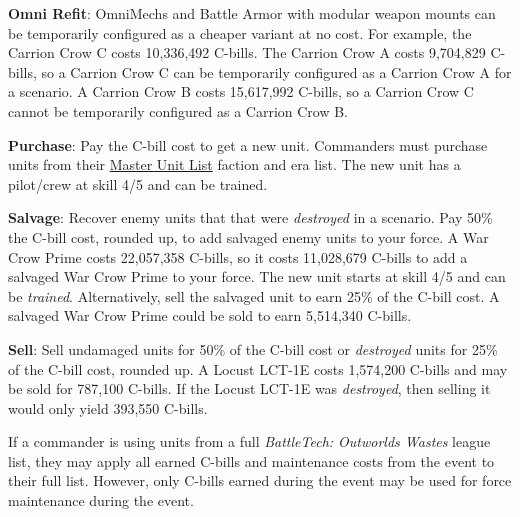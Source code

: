 \begin{description}
\item {\bfseries Omni Refit}: OmniMechs and Battle Armor with modular weapon mounts can be temporarily configured as a cheaper variant at no cost.
For example, the Carrion Crow C costs 10,336,492 C-bills.
The Carrion Crow A costs 9,704,829 C-bills, so a Carrion Crow C can be temporarily configured as a Carrion Crow A for a scenario.
A Carrion Crow B costs 15,617,992 C-bills, so a Carrion Crow C cannot be temporarily configured as a Carrion Crow B.

\item {\bfseries Purchase}: Pay the C-bill cost to get a new unit.
Commanders must purchase units from their \href{http://www.masterunitlist.info}{Master Unit List} faction and era list.
The new unit has a pilot/crew at skill 4/5 and can be trained.

\item {\bfseries Salvage}: Recover enemy units that that were \emph{destroyed} in a scenario.
Pay 50\% the C-bill cost, rounded up, to add salvaged enemy units to your force.
A War Crow Prime costs 22,057,358 C-bills, so it costs 11,028,679 C-bills to add a salvaged War Crow Prime to your force.
The new unit starts at skill 4/5 and can be \emph{trained}.
Alternatively, sell the salvaged unit to earn 25\% of the C-bill cost.
A salvaged War Crow Prime could be sold to earn 5,514,340 C-bills.

\item {\bfseries Sell}: Sell undamaged units for 50\% of the C-bill cost or \emph{destroyed} units for 25\% of the C-bill cost, rounded up.
A Locust LCT-1E costs 1,574,200 C-bills and may be sold for 787,100 C-bills.
If the Locust LCT-1E was \emph{destroyed}, then selling it would only yield 393,550 C-bills.

\end{description}

If a commander is using units from a full \emph{BattleTech: Outworlds Wastes} league list, they may apply all earned C-bills and maintenance costs from the event to their full list.
However, only C-bills earned during the event may be used for force maintenance during the event.
